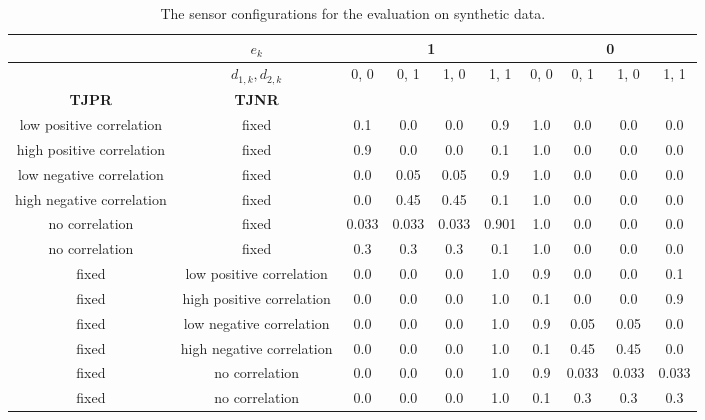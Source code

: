 \begin{table}
\begin{center}
 \begin{tabular}{| c | c || c | c | c | c || c | c | c | c|} 
 \hline
     & $e_k$ &  \multicolumn{4}{|c||}{1} &  \multicolumn{4}{c|}{0} \\
 \hline
 & $d_{1,k}, d_{2,k}$  & 0, 0 & 0, 1 & 1, 0 & 1, 1 & 0, 0 & 0, 1 & 1, 0  & 1, 1\\ [0.5ex] 
 \hline\hline
 \textbf{TJPR} & \textbf{TJNR} &  &  &  &  &  &  &  & \\ [0.5ex] 
 \hline
 \hline
 low positive correlation & fixed & 0.1 & 0.0 & 0.0 & 0.9 & 1.0 & 0.0 & 0.0 & 0.0\\ [0.5ex] 
 \hline
 high positive correlation & fixed & 0.9 & 0.0 & 0.0 & 0.1 & 1.0 & 0.0 & 0.0 & 0.0\\ [0.5ex] 
 \hline
 low negative correlation & fixed & 0.0 & 0.05 & 0.05 & 0.9 & 1.0 & 0.0 & 0.0 & 0.0\\ [0.5ex] 
 \hline
 high negative correlation & fixed & 0.0 & 0.45 & 0.45 & 0.1 & 1.0 & 0.0 & 0.0 & 0.0\\ [0.5ex] 
 \hline
 no correlation & fixed & 0.033 & 0.033 & 0.033 & 0.901 & 1.0 & 0.0 & 0.0 & 0.0\\ [0.5ex] 
 \hline
 no correlation & fixed & 0.3 & 0.3 & 0.3 & 0.1 & 1.0 & 0.0 & 0.0 & 0.0\\ [0.5ex] 
 \hline
 fixed & low positive correlation  & 0.0 & 0.0 & 0.0 & 1.0 & 0.9 & 0.0 & 0.0 & 0.1\\ [0.5ex] 
 \hline
 fixed & high positive correlation  & 0.0 & 0.0 & 0.0 & 1.0 & 0.1 & 0.0 & 0.0 & 0.9\\ [0.5ex] 
 \hline
 fixed & low negative correlation  & 0.0 & 0.0 & 0.0 & 1.0 & 0.9 & 0.05 & 0.05 & 0.0\\ [0.5ex] 
 \hline
 fixed & high negative correlation  & 0.0 & 0.0 & 0.0 & 1.0 & 0.1 & 0.45 & 0.45 & 0.0\\ [0.5ex] 
 \hline
 fixed & no correlation  & 0.0 & 0.0 & 0.0 & 1.0 & 0.9 & 0.033 & 0.033 & 0.033\\ [0.5ex] 
 \hline
 fixed & no correlation  & 0.0 & 0.0 & 0.0 & 1.0 & 0.1 & 0.3 & 0.3 & 0.3\\ [0.5ex] 
 \hline
\end{tabular}
\end{center}
\caption{The sensor configurations for the evaluation on synthetic data.}
\label{tab:eval_sim}
\end{table}


